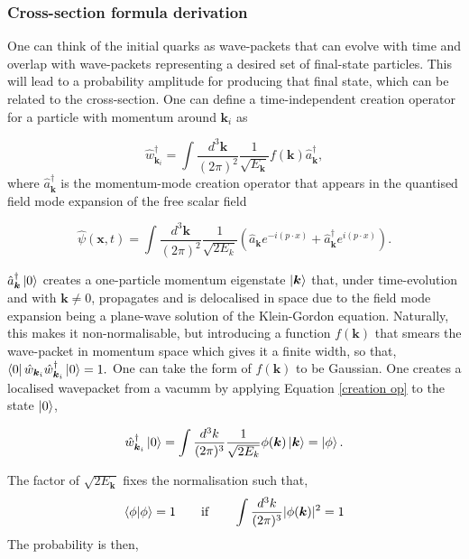 \documentclass[a4paper,11pt]{article}
\begin{document}
\subsubsection{Cross-section formula derivation}
One can think of the initial quarks as wave-packets that can evolve with time and overlap with wave-packets representing a desired set of final-state particles. This will lead to a probability amplitude for producing that final state, which can be related to the cross-section. One can define a time-independent creation operator for a particle with momentum around $\boldsymbol{k}_i$ as

\begin{equation}\label{creation op}
	\hat{w}_{\boldsymbol{k}_i}^\dagger = \int \frac{d^3\boldsymbol{k}}{(2\pi)^2}\frac{1}{\sqrt{E_{\boldsymbol{k}}}}  f(\boldsymbol{k})\hat{a}_{\boldsymbol{k}}^\dagger,
\end{equation}
where $\hat{a}_{\boldsymbol{k}}^\dagger$ is the momentum-mode creation operator that appears in the quantised field mode expansion of the free scalar field

 $$\hat{\psi}(\boldsymbol{x},t) = \int \frac{d^3 \boldsymbol{k}}{(2\pi)^2}\frac{1}{\sqrt{2E_k}}(\hat{a}_{\boldsymbol{k}}e^{-i(p\cdot x)} + \hat{a}_{\boldsymbol{k}}^\dagger e^{i(p\cdot x)}).$$

$\hat{a}_{\boldsymbol{k}}^\dagger \ket{0}$ creates a one-particle momentum eigenstate $\ket{\boldsymbol{k}}$ that, under time-evolution and with  $\boldsymbol{k} \neq 0$, propagates and is delocalised in space due to the field mode expansion being a plane-wave solution of the Klein-Gordon equation.  Naturally, this makes it non-normalisable, but introducing a function $f(\boldsymbol{k})$ that smears the wave-packet in momentum space which gives it a finite width, so that, $\bra{0}\hat{w}_{\boldsymbol{k}_i}\hat{w}_{\boldsymbol{k}_i}^\dagger\ket{0}=1.$ One can take the form of $f(\boldsymbol{k})$ to be Gaussian. One creates a localised wavepacket from a vacumm by applying Equation \ref{creation op} to the state $\ket{0}$,

$$\hat{w}_{\boldsymbol{k}_i}^\dagger\ket{0} = \int \frac{d^3 k}{(2\pi)^3}\frac{1}{\sqrt{2E_k}}\phi(\boldsymbol{k})\ket{\boldsymbol{k}} = \ket{\phi}. $$

The factor of $\sqrt{2E_{\boldsymbol{k}}}$ fixes the normalisation such that,
\begin{equation}\label{normalisation}
	\bra{\phi}\ket{\phi} = 1 \qquad \text{if} \qquad \int\frac{d^3k}{(2\pi)^3}|\phi(\boldsymbol{k})|^2 = 1
\end{equation} 
	The probability is then, 
\end{document}
